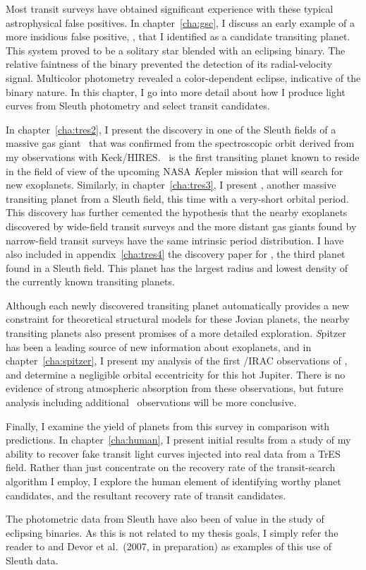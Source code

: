 Most transit surveys have obtained significant experience with these typical astrophysical false positives.
In chapter~\ref{cha:gsc}, I discuss an early example of a more insidious false positive, \gscOTE, that I identified as a candidate transiting planet.
This system proved to be a solitary star blended with an eclipsing binary.
The relative faintness of the binary prevented the detection of its radial-velocity signal.
Multicolor photometry revealed a color-dependent eclipse, indicative of the binary nature.
In this chapter, I go into more detail about how I produce light curves from Sleuth photometry and select transit candidates.

In chapter~\ref{cha:tres2}, I present the discovery in one of the Sleuth fields of a massive gas giant \tresTwo\ that was confirmed from the spectroscopic orbit derived from my observations with Keck/HIRES.\@
\tresTwo\ is the first transiting planet known to reside in the field of view of the upcoming NASA {\textit Kepler} mission that will search for new exoplanets.
Similarly, in chapter~\ref{cha:tres3}, I present \tresThree, another massive transiting planet from a Sleuth field, this time with a very-short orbital period.
This discovery has further cemented the hypothesis that the nearby exoplanets discovered by wide-field transit surveys and the more distant gas giants found by narrow-field transit surveys have the same intrinsic period distribution.
I have also included in appendix~\ref{cha:tres4} the discovery paper for \tresFour, the third planet found in a Sleuth field.
This planet has the largest radius and lowest density of the currently known transiting planets.

Although each newly discovered transiting planet automatically provides a new constraint for theoretical structural models for these Jovian planets, the nearby transiting planets also present promises of a more detailed exploration.
{\textit Spitzer} has been a leading source of new information about exoplanets, and in chapter~\ref{cha:spitzer}, I present my analysis of the first \spi/IRAC observations of \tresTwo, and determine a negligible orbital eccentricity for this hot Jupiter. There is no evidence of strong atmospheric absorption from these observations, but future analysis including additional \spi\ observations will be more conclusive.

Finally, I examine the yield of planets from this survey in comparison with predictions.
In chapter~\ref{cha:human}, I present initial results from a study of my ability to recover fake transit light curves injected into real data from a TrES field.
Rather than just concentrate on the recovery rate of the transit-search algorithm I employ, I explore the human element of identifying worthy planet candidates, and the resultant recovery rate of transit candidates.

The photometric data from Sleuth have also been of value in the study of eclipsing binaries. As this is not related to my thesis goals, I simply refer the reader to \citet{Creevey_Benedict_Brown:apjl:2005a} and Devor et al.~(2007, in preparation) as examples of this use of Sleuth data.%
